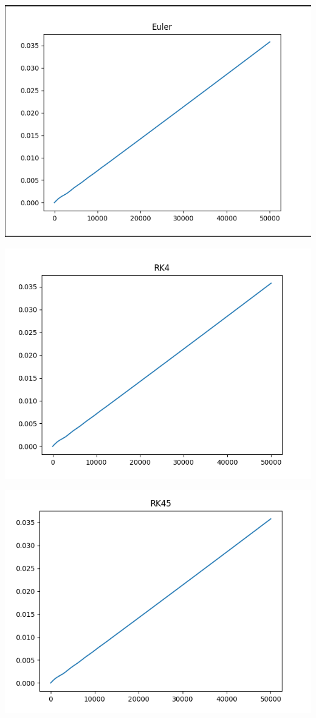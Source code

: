 \begin{center}
\begin{minipage}{0.45\textwidth}
\includegraphics[width=\linewidth]{rapport/bilder/eulerError.png}
\end{minipage}\hfill
\begin{minipage}{0.45\textwidth}
\includegraphics[width=\linewidth]{rapport/bilder/RK4Error.png} 
\end{minipage}
\begin{minipage}{0.45\textwidth}
\includegraphics[width=\linewidth]{rapport/bilder/RK45.png} 

\end{minipage}
\end{center}
